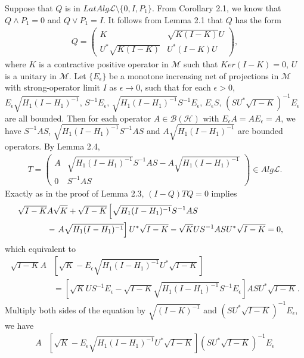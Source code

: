 \documentclass[12pt]{article}
\newcommand{\BBB}{\mathcal B}
\newcommand{\HHH}{\mathcal H} %
\newcommand{\LLL}{\mathcal L} %
\newcommand{\MMM}{\mathcal M}
\begin{document}
{\quad Suppose that $Q$ is in $LatAlg\LLL
\setminus \{0, I, P_{1}\}$. From Corollary 2.1, we know that
$Q\wedge P_1=0$ and $Q\vee P_1=I$. It follows from Lemma 2.1 that
$Q$ has the form
\begin{align*}
Q = \left(\begin{array}{cc}K & \sqrt{K(I-K)}U \\U^{*}\sqrt{K(I-K)} &
U^{*}(I-K)U \end{array}\right),
\end{align*}
where $K$ is a contractive positive operator in $\MMM$ such that
$Ker(I-K)=0$, $U$ is a unitary in $\MMM$. Let $\{E_\epsilon \}$ be a monotone increasing net of projections in $\MMM$ with 
strong-operator limit $I$ as $\epsilon \rightarrow 0$, such that for each $\epsilon > 0$, $E_\epsilon \sqrt{H_1 (I - H_1)^{-1}}$,
$S^{-1}E_\epsilon$, $\sqrt{H_1(I-H_1)^{-1}}S^{-1} E_\epsilon$,
$E_{\epsilon}S$, $(SU^{*}\sqrt{I-K})^{-1}E_\epsilon$ are all
bounded. Then for each operator $A \in \BBB(\HHH)$ with $E_\epsilon
A = A E_\epsilon = A$, we have $S^{-1}AS$,
$\sqrt{H_{1}(I-H_{1})^{-1}}S^{-1}AS$ and
$A\sqrt{H_{1}(I-H_{1})^{-1}}$ are bounded operators. By Lemma 2.4, 
\begin{align*}
T = \left(\begin{array}{cc}A & \sqrt{H_{1}(I-H_{1})^{-1}}S^{-1}AS
-A\sqrt{H_{1}(I-H_{1})^{-1}}  \\0 & S^{-1}AS \end{array}\right) \in
 Alg\LLL.
\end{align*}
Exactly as in the proof of  Lemma 2.3, $(I-Q)TQ = 0$ implies
\begin{align*}
\sqrt{I-K}&A\sqrt{K} +
\sqrt{I-K}\left[\sqrt{H_{1}(I-H_{1})^{-1}}S^{-1}AS \right.\cr & -
\left.A\sqrt{H_{1}(I-H_{1})^{-1}}\right]U^{*}\sqrt{I-K} -
\sqrt{K}US^{-1}ASU^{*}\sqrt{I-K} = 0,
\end{align*}
which equivalent to
\begin{align*}
\sqrt{I-K}A&\left[\sqrt{K} -
E_{\epsilon}\sqrt{H_{1}(I-H_{1})^{-1}}U^{*}\sqrt{I-K}\right]\\
& =\left[\sqrt{K}US^{-1}E_{\epsilon} -
\sqrt{I-K}\sqrt{H_{1}(I-H_{1})^{-1}}S^{-1}E_{\epsilon}\right]ASU^{*}\sqrt{I-K}.
\end{align*}
Multiply both sides of the equation by $\sqrt{(I-K)^{-1}}$ and $(SU^{*}\sqrt{I-K})^{-1}E_\epsilon$, we have 
\begin{align*}
A&[\sqrt{K} -
E_\epsilon\sqrt{H_{1}(I-H_{1})^{-1}}U^{*}\sqrt{I-K}](SU^{*}\sqrt{I-K})^{-1}E_\epsilon \\

\end{align*}}
\end{document}
